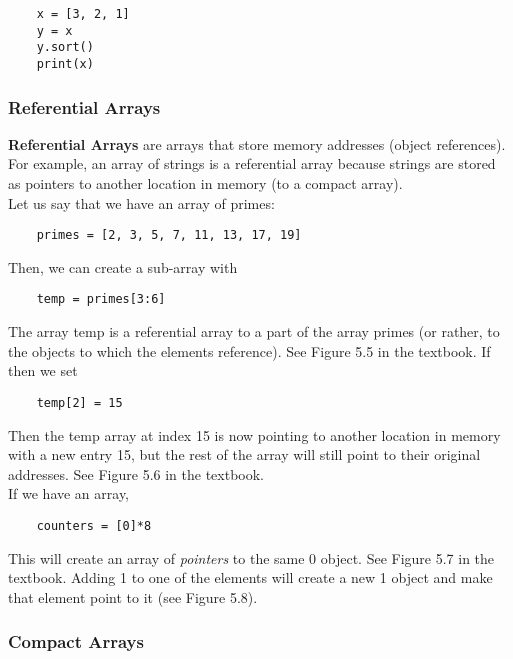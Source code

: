\documentclass[]{article}
\begin{document}
\begin{lstlisting}
	x = [3, 2, 1]
	y = x
	y.sort()
	print(x)
\end{lstlisting}\bigbreak

\subsubsection{Referential Arrays}\bigbreak
\textbf{Referential Arrays} are arrays that store memory addresses (object references). For example, an array of strings is a referential array because strings are stored as pointers to another location in memory (to a compact array).\\

Let us say that we have an array of primes: 

\begin{lstlisting}
	primes = [2, 3, 5, 7, 11, 13, 17, 19]
\end{lstlisting}\bigbreak

Then, we can create a sub-array with

\begin{lstlisting}
	temp = primes[3:6]
\end{lstlisting}\bigbreak

The array temp is a referential array to a part of the array primes (or rather, to the objects to which the elements reference). See Figure 5.5 in the textbook. If then we set

\begin{lstlisting}
	temp[2] = 15
\end{lstlisting}\bigbreak

Then the temp array at index 15 is now pointing to another location in memory with a new entry 15, but the rest of the array will still point to their original addresses. See Figure 5.6 in the textbook.  \\

If we have an array, 

\begin{lstlisting}
	counters = [0]*8
\end{lstlisting}\bigbreak

This will create an array of \textit{pointers} to the same 0 object. See Figure 5.7 in the textbook. Adding 1 to one of the elements will create a new 1 object and make that element point to it (see Figure 5.8).\\

\subsubsection{Compact Arrays}\bigbreak
\end{document}
